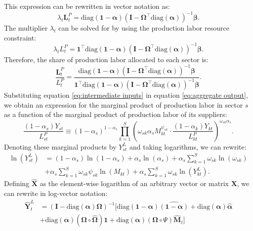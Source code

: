 \documentclass[12pt]{article}
\begin{document}
This expression can be rewritten in vector notation as:
\begin{equation*}
    \lambda_t \mathbf{L}_t^P = \text{diag}(\mathbf{1} - \bm{\alpha}) (\mathbf{I} - \bm{\Omega}^{\top} \text{diag}(\bm{\alpha}))^{-1} \bm{\beta}.
\end{equation*}
The multiplier $\lambda_t$ can be solved for by using the production labor resource constraint:
\begin{equation*}
    \lambda_t L_t^P = \mathbf{1}^{\top} \text{diag}(\mathbf{1} - \bm{\alpha}) (\mathbf{I} - \bm{\Omega}^{\top} \text{diag}(\bm{\alpha}))^{-1} \bm{\beta}.
\end{equation*}
Therefore, the share of production labor allocated to each sector is:
\begin{equation*}
    \frac{\mathbf{L}_t^P}{L_t^P} = \frac{\text{diag}(\mathbf{1} - \bm{\alpha}) (\mathbf{I} - \bm{\Omega}^{\top} \text{diag}(\bm{\alpha}))^{-1} \bm{\beta}}{\mathbf{1}^{\top} \text{diag}(\mathbf{1} - \bm{\alpha}) (\mathbf{I} - \bm{\Omega}^{\top} \text{diag}(\bm{\alpha}))^{-1} \bm{\beta}}.
\end{equation*}
Substituting equation \eqref{eq:intermediate inputs} in equation \eqref{eq:aggregate output}, we obtain an expression for the marginal product of production labor in sector $s$ as a function of the marginal product of production labor of its suppliers:
\begin{equation*}
    \frac{(1 - \alpha_s) Y_{st}}{L_{st}^P} \equiv (1 - \alpha_s)^{1 - \alpha_s} \prod_{k = 1}^S \left(\omega_{sk} \alpha_s M_{kt}^{\psi_{sk}} \cdot \frac{(1 - \alpha_k) Y_{kt}}{L_{kt}^P}\right)^{\omega_{sk} \alpha_s}.
\end{equation*}
Denoting these marginal products by $Y_{st}^L$ and taking logarithms, we can rewrite:
\begin{align*}
    \ln(Y_{st}^L) &= (1 - \alpha_s) \ln(1 - \alpha_s) + \alpha_s \ln(\alpha_s) + \alpha_s \sum_{k = 1}^S \omega_{sk} \ln(\omega_{sk}) \\
    &+ \alpha_s \sum_{k = 1}^S \omega_{sk} \psi_{sk} \ln(M_{kt}) + \alpha_s \sum_{k = 1}^S \omega_{sk} \ln(Y_{kt}^L).
\end{align*}
Defining $\hat{\mathbf{X}}$ as the element-wise logarithm of an arbitrary vector or matrix $\mathbf{X}$, we can rewrite in log-vector notation:
\begin{align*}
    \hat{\mathbf{Y}}_t^L &= (\mathbf{I} - \text{diag}(\bm{\alpha}) \bm{\Omega})^{-1} [\text{diag}(\mathbf{1} - \bm{\alpha}) \widehat{(\mathbf{1} - \bm{\alpha})} + \text{diag}(\bm{\alpha}) \hat{\bm{\alpha}} \\
    &+ \text{diag}(\bm{\alpha}) (\bm{\Omega} \circ \hat{\bm{\Omega}}) \mathbf{1} + \text{diag}(\bm{\alpha}) (\bm{\Omega} \circ \Psi) \hat{\mathbf{M}}_t]
\end{align*}
\end{document}
